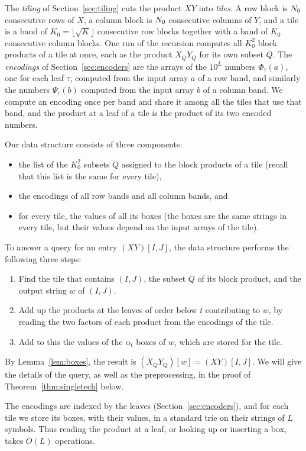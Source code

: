 The \emph{tiling} of Section~\ref{sec:tiling} cuts the product $XY$ into \emph{tiles}. A row block is $N_0$ consecutive rows of $X$, a column block is $N_0$ consecutive columns of $Y$, and a tile is a band of $K_0=\lfloor\sqrt K\rfloor$ consecutive row blocks together with a band of $K_0$ consecutive column blocks. One run of the recursion computes all $K_0^2$ block products of a tile at once, each as the product $X_QY_Q$ for its own subset $Q$. The \emph{encodings} of Section~\ref{sec:encoders} are the arrays of the $10^L$ numbers $\Phi_\tau(a)$, one for each leaf $\tau$, computed from the input array $a$ of a row band, and similarly the numbers $\Psi_\tau(b)$ computed from the input array $b$ of a column band. We compute an encoding once per band and share it among all the tiles that use that band, and the product at a leaf of a tile is the product of its two encoded numbers.

Our data structure consists of three components:
\begin{itemize}[nosep]
\item the list of the $K_0^2$ subsets $Q$ assigned to the block products of a tile (recall that this list is the same for every tile),
\item the encodings of all row bands and all column bands, and
\item for every tile, the values of all its boxes (the boxes are the same strings in every tile, but their values depend on the input arrays of the tile).
\end{itemize}
To answer a query for an entry $(XY)[I,J]$, the data structure performs the following three steps:
\begin{enumerate}[label=(\arabic*),nosep]
\item Find the tile that contains $(I,J)$, the subset $Q$ of its block product, and the output string $w$ of $(I,J)$.
\item Add up the products at the leaves of order below $t$ contributing to $w$, by reading the two factors of each product from the encodings of the tile.
\item Add to this the values of the $\alpha_t$ boxes of $w$, which are stored for the tile.
\end{enumerate}
By Lemma~\ref{lem:boxes}, the result is $(X_QY_Q)[w]=(XY)[I,J]$. We will give the details of the query, as well as the preprocessing, in the proof of Theorem~\ref{thm:singletech} below.

The encodings are indexed by the leaves (Section~\ref{sec:encoders}), and for each tile we store its boxes, with their values, in a standard trie on their strings of $L$ symbols. Thus reading the product at a leaf, or looking up or inserting a box, takes $O(L)$ operations.

